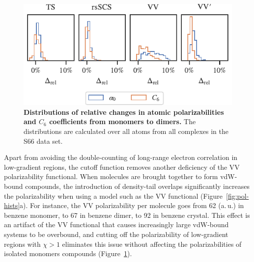\begin{figure}[t!]
\centering
\includegraphics{../media/pol-shifts.pdf}
\caption{\textbf{Distributions of relative changes in atomic polarizabilities and $C_6$ coefficients from monomers to dimers.}
The distributions are calculated over all atoms from all complexes in the S66 data set.
}\label{fig:pol-shifts}
\end{figure}

Apart from avoiding the double-counting of long-range electron correlation in low-gradient regions, the cutoff function removes another deficiency of the VV polarizability functional.
When molecules are brought together to form vdW-bound compounds, the introduction of density-tail overlaps significantly increases the polarizability when using a model such as the VV functional (Figure~\ref{fig:pol-hists}a).
For instance, the VV polarizability per molecule goes from 62 (a.\,u.) in benzene monomer, to 67 in benzene dimer, to 92 in benzene crystal.
This effect is an artifact of the VV functional that causes increasingly large vdW-bound systems to be overbound, and cutting off the polarizability of low-gradient regions with $\chi>1$ eliminates this issue without
affecting the polarizabilities of isolated monomers compounds (Figure~\ref{fig:pol-shifts}).


